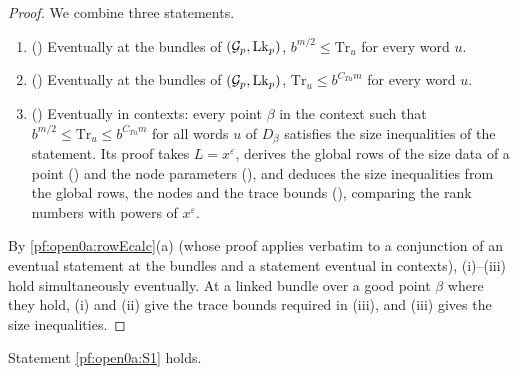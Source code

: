 \begin{proof}
We combine three statements.
\begin{enumerate}[label=(\roman*)]
\item () Eventually at the bundles of
$(\mathcal G_p,\mathrm{Lk}_p)$, $b^{m/2}\le\mathrm{Tr}_u$ for every word $u$.
\item () Eventually at the bundles of
$(\mathcal G_p,\mathrm{Lk}_p)$, $\mathrm{Tr}_u\le b^{C_{Tu}m}$ for every word $u$.
\item () Eventually in contexts: every point $\beta$ in the context such that
$b^{m/2}\le\mathrm{Tr}_u\le b^{C_{Tu}m}$ for all words $u$ of $D_\beta$ satisfies the size inequalities of the
statement. Its proof takes $L=x^{\varepsilon}$, derives the global rows of the size data of a point
() and the node parameters
(), and deduces the size inequalities from the global
rows, the nodes and the trace bounds (), comparing the
rank numbers with powers of $x^\varepsilon$.
\end{enumerate}
By \cref{pf:open0a:rowEcalc}(a) (whose proof applies verbatim to a conjunction of an eventual statement at the
bundles and a statement eventual in contexts), (i)--(iii) hold simultaneously eventually. At a linked bundle over a
good point $\beta$ where they hold, (i) and (ii) give the trace bounds required in (iii), and (iii) gives the size
inequalities.
\end{proof}

\begin{lemma}\label{pf:open0a:sizes}
Statement \ref{pf:open0a:S1} holds.
\end{lemma}

